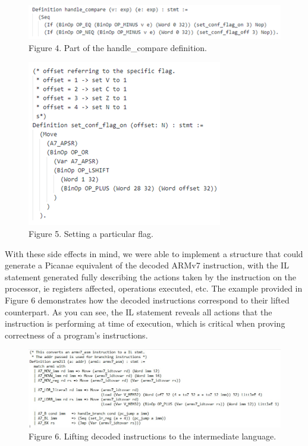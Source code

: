 \documentclass[twocolumn]{article}
\begin{document}
\begin{figure}[H]
\centering
\includegraphics[width=\linewidth]{handle_compare_definition.png}\\
Figure 4. Part of the handle\_compare definition.


\end{figure}
\begin{figure}[H]
\centering
\includegraphics[width=.7\linewidth]{set_flag_example.png}\\
Figure 5. Setting a particular flag.

\end{figure}
With these side effects in mind, we were able to implement a structure that could generate a Picanae equivalent of the decoded ARMv7 instruction, with the IL statement generated fully describing the actions taken by the instruction on the processor, ie registers affected, operations executed, etc. The example provided in Figure 6 demonstrates how the decoded instructions correspond to their lifted counterpart. As you can see, the IL statement reveals all actions that the instruction is performing at time of execution, which is critical when proving correctness of a program's instructions.
\begin{figure}[!ht]
\centering
\includegraphics[width=0.8\linewidth]{arm2il_example.jpg}\\
Figure 6. Lifting decoded instructions to the intermediate language.

\end{figure}
\end{document}
